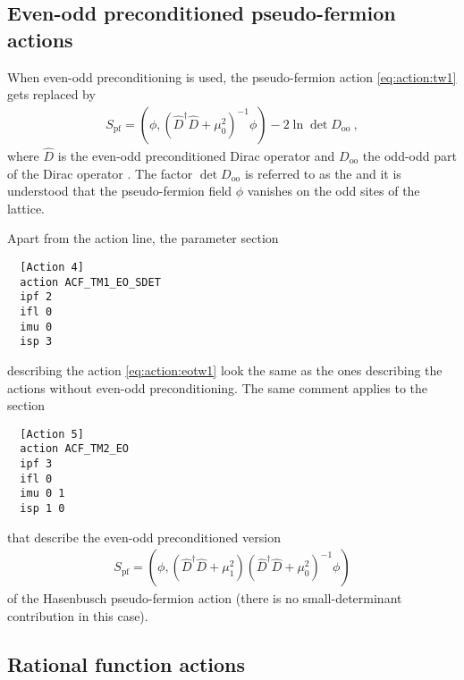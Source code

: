 \documentclass[11pt,fleqn]{article}
\begin{document}
\subsection{Even-odd preconditioned pseudo-fermion actions}

When even-odd preconditioning is used, the pseudo-fermion action
\eqref{eq:action:tw1} gets replaced by
%
\begin{gather}
   S_\text{pf} = ( \phi, (\hat{D}^\dag \hat{D} + \mu_0^2)^{-1} \phi ) - 2\ln \det D_\text{oo}
   \label{eq:action:eotw1}
   \ ,
\end{gather}
%
where $\hat{D}$ is the even-odd preconditioned Dirac operator and $D_\text{oo}$
the odd-odd part of the Dirac operator \cite{openQCD:dirac}. The factor $\det
D_\text{oo}$ is referred to as the  and it is understood
that the pseudo-fermion field $\phi$ vanishes on the odd sites of the lattice.

Apart from the action line, the parameter section
%
\begin{verbatim}
  [Action 4]
  action ACF_TM1_EO_SDET
  ipf 2
  ifl 0
  imu 0
  isp 3
\end{verbatim}
%
describing the action \eqref{eq:action:eotw1} look the same as the ones
describing the actions without even-odd preconditioning. The same comment
applies to the section
%
\begin{verbatim}
  [Action 5]
  action ACF_TM2_EO
  ipf 3
  ifl 0
  imu 0 1
  isp 1 0
\end{verbatim}
%
that describe the even-odd preconditioned version 
%
\begin{gather}
   S_\text{pf} = ( \phi, (\hat{D}^\dag \hat{D} + \mu_1^2) (\hat{D}^\dag \hat{D} + \mu_0^2)^{-1} \phi )
   \label{eq:action:eotw2}
\end{gather}
%
of the Hasenbusch pseudo-fermion action (there is no small-determinant
contribution in this case).


\subsection{Rational function actions}
\end{document}
